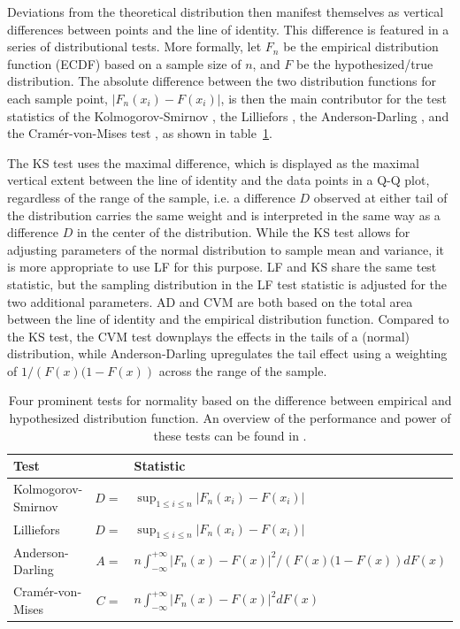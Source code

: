 \documentclass{article}\usepackage[]{graphicx}\usepackage[]{color}
\newcommand{\al}[1]{{\color{red} #1}}
\begin{document}
Deviations from the theoretical distribution then manifest themselves as vertical differences between points and the line of identity. This difference is featured in a series of distributional tests. More formally, let $F_n$ be the empirical distribution function (ECDF) based on a sample size of $n$, and $F$ be the hypothesized/true distribution. The absolute difference between the two distribution functions for each sample point, $\left| F_n(x_i) - F(x_i) \right|$, is then the main contributor for the test statistics of the Kolmogorov-Smirnov \cite[KS-test,][]{kolmogorov:1933, smirnov:1948}, the Lilliefors \cite[LF-test, ][]{lilliefors}, the Anderson-Darling \citep[AD-test,][]{adtest:1954}, and the Cram\'{e}r-von-Mises test \citep[CVM-test,][]{cramer:1928, mises:1928}, as shown in table~\ref{tab:tests}.

The KS test uses the maximal  difference, which is displayed as the maximal vertical extent between the line of identity and the data points in a Q-Q plot, regardless of the range of the sample, i.e. a difference $D$ observed at either tail of the distribution carries the same weight and is interpreted in the same way as a difference $D$ in the center of the distribution. While the KS test allows for adjusting parameters of the normal distribution to sample mean and variance, it is more appropriate to use LF for this purpose. LF and KS share the same test statistic, but the \al{sampling distribution} in the LF test \al{statistic} is adjusted for the two additional parameters.  AD and CVM  are both based on the total area between the line of identity and the empirical distribution function. Compared to the KS  test,  the CVM test downplays the effects in the tails of a (normal) distribution, while Anderson-Darling upregulates the tail effect using a weighting of $1/\left(F(x)(1 - F(x)\right)$ across the range of the sample. 


\begin{table}
\centering
\begin{tabular}{lrl}\hline
Test && Statistic\\\hline\hline
Kolmogorov-Smirnov & $D =$ & $ \sup_{1 \le i \le n} \left | F_n(x_i) - F(x_i)\right|$ \\
Lilliefors & $D =$ & $ \sup_{1 \le i \le n} \left | F_n(x_i) - F(x_i)\right|$ \\
Anderson-Darling & $A =$ & $ n \int_{-\infty}^{+\infty} \left | F_n(x) - F(x)\right|^2/\left(F(x)(1 - F(x)\right) dF(x)$\\
Cram\'{e}r-von-Mises & $C =$ & $n \int_{-\infty}^{+\infty} \left | F_n(x) - F(x)\right|^2 dF(x)$ \\\hline
\end{tabular}
\caption{\label{tab:tests} Four prominent tests for normality based on the difference between empirical and hypothesized distribution function. An overview of the performance and power of these tests can be found in \citet{stephens:1974}.}
\end{table}
%
\end{document}
